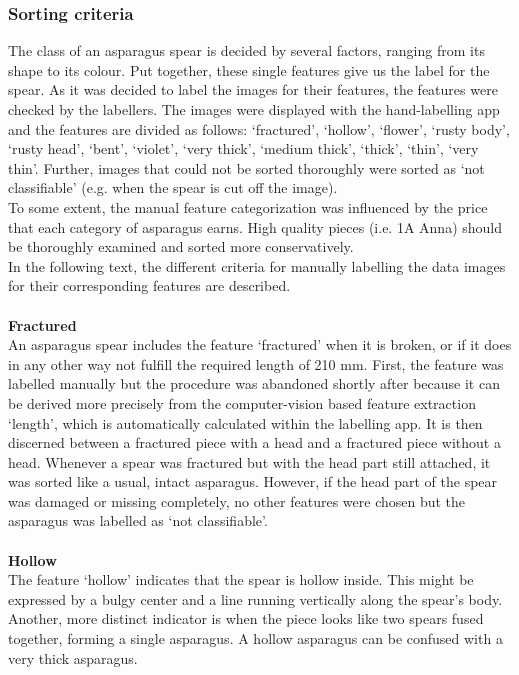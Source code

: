\subsubsection{Sorting criteria}
\label{subsec:SortingCriteria}

The class of an asparagus spear is decided by several factors, ranging from its shape to its colour. Put together, these single features give us the label for the spear. As it was decided to label the images for their features, the features were checked by the labellers. The images were displayed with the hand-labelling app and the features are divided as follows: ‘fractured’, ‘hollow’, ‘flower’, ‘rusty body’, ‘rusty head’, ‘bent’, ‘violet’, ‘very thick’, ‘medium thick’, ‘thick’, ‘thin’, ‘very thin’. Further, images that could not be sorted thoroughly were sorted as ‘not classifiable’ (e.g. when the spear is cut off the image). \\
To some extent, the manual feature categorization was influenced by the price that each category of asparagus earns. High quality pieces (i.e. 1A Anna) should be thoroughly examined and sorted more conservatively. \\
In the following text, the different criteria for manually labelling the data images for their corresponding features are described. \\
 \\
\textbf{Fractured} \\
An asparagus spear includes the feature ‘fractured’ when it is broken, or if it does in any other way not fulfill the required length of 210 mm.
First, the feature was labelled manually but the procedure was abandoned shortly after because it can be derived  more precisely from the computer-vision based feature extraction ‘length’, which is automatically calculated within the labelling app.
It is then discerned between a fractured piece with a head and a fractured piece without a head. Whenever a spear was fractured but with the head part still attached, it was sorted like a usual, intact asparagus. However, if the head part of the spear was damaged or missing completely, no other features were chosen but the asparagus was labelled as ‘not classifiable’. \\
 \\
\textbf{Hollow} \\
The feature ‘hollow’ indicates that the spear is hollow inside.
This might be expressed by a bulgy center and a line running vertically along the spear’s body. Another, more distinct indicator is when the piece looks like two spears fused together, forming a single asparagus. A hollow asparagus can be confused with a very thick asparagus. \\

